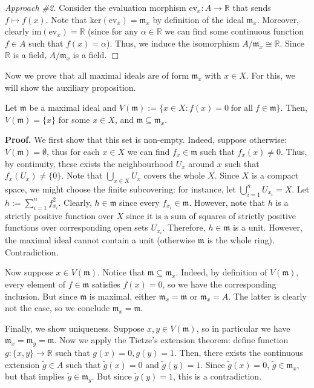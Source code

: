 \documentclass{template}
\newcommand{\qedwhite}{\hfill \ensuremath{\Box}}
\begin{document}
\textit{Approach \#2.} Consider the evaluation morphism $\text{ev}_x: A \to
\mathbb{R}$ that sends $f \mapsto f(x)$. Note that $\text{ker}(\text{ev}_x) =
\mathfrak{m}_x$ by definition of the ideal $\mathfrak{m}_x$. Moreover, clearly
$\text{im}(\text{ev}_x) = \mathbb{R}$ (since for any $\alpha \in \mathbb{R}$ we
can find some continuous function $f \in A$ such that $f(x)=\alpha$). Thus, we
induce the isomorphism $A/\mathfrak{m}_x \cong \mathbb{R}$. Since $\mathbb{R}$
is a field, $A/\mathfrak{m}_x$ is a field. \qedwhite

Now we prove that all maximal ideals are of form $\mathfrak{m}_x$ with $x \in
X$. For this, we will show the auxiliary proposition.

\begin{propositions}
    Let $\mathfrak{m}$ be a maximal ideal and $V(\mathfrak{m}) := \{x \in X:
f(x) = 0 \; \text{for all} \; f \in \mathfrak{m}\}$. Then, $V(\mathfrak{m}) =
\{x\}$ for some $x \in X$, and $\mathfrak{m} \subseteq \mathfrak{m}_x$.
\end{propositions}

\textbf{Proof.} We first show that this set is non-empty. Indeed, suppose
otherwise: $V(\mathfrak{m}) = \emptyset$, thus for each $x \in X$ we can find
$f_x \in \mathfrak{m}$ such that $f_x(x) \neq 0$. Thus, by continuity, these
exists the neighbourhood $U_x$ around $x$ such that $f_x(U_x) \neq \{0\}$. Note
that $\bigcup_{x \in X}U_x$ covers the whole $X$. Since $X$ is a compact space,
we might choose the finite subcovering: for instance, let $\bigcup_{i=1}^n
U_{x_i} = X$. Let $h := \sum_{i=1}^n f_{x_i}^2$. Clearly, $h \in \mathfrak{m}$
since every $f_{x_i} \in \mathfrak{m}$. However, note that $h$ is a strictly
positive function over $X$ since it is a sum of squares of strictly positive
functions over corresponding open sets $U_{x_i}$. Therefore, $h \in
\mathfrak{m}$ is a unit. However, the maximal ideal cannot contain a unit
(otherwise $\mathfrak{m}$ is the whole ring). Contradiction.

Now suppose $x \in V(\mathfrak{m})$. Notice that $\mathfrak{m} \subseteq
\mathfrak{m}_x$. Indeed, by definition of $V(\mathfrak{m})$, every element of $f
\in \mathfrak{m}$ satisfies $f(x) = 0$, so we have the corresponding inclusion.
But since $\mathfrak{m}$ is maximal, either $\mathfrak{m}_x = \mathfrak{m}$ or
$\mathfrak{m}_x = A$. The latter is clearly not the case, so we conclude
$\mathfrak{m}_x = \mathfrak{m}$.

Finally, we show uniqueness. Suppose $x,y \in V(\mathfrak{m})$, so in particular
we have $\mathfrak{m}_x = \mathfrak{m}_y = \mathfrak{m}$. Now we apply the
Tietze's extension theorem: define function $g: \{x,y\} \to \mathbb{R}$ such
that $g(x) = 0, g(y) = 1$. Then, there exists the continuous extension
$\widetilde{g} \in A$ such that $\widetilde{g}(x)=0$ and $\widetilde{g}(y)=1$.
Since $\widetilde{g}(x)=0$, $\widetilde{g} \in \mathfrak{m}_x$, but that implies
$\widetilde{g} \in \mathfrak{m}_y$. But since $\widetilde{g}(y)=1$, this is a
contradiction.
\end{document}
